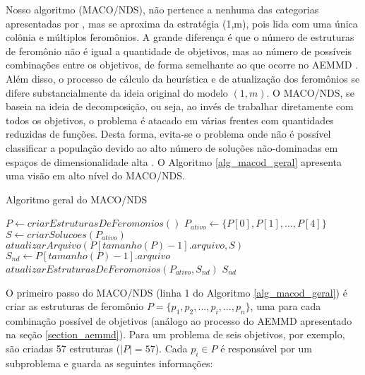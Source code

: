 Nosso algoritmo (MACO/NDS), não pertence a nenhuma das categorias apresentadas por \cite{Alaya2007}, mas se aproxima da estratégia (1,m), pois lida com uma única colônia e múltiplos feromônios. A grande diferença é que o número de estruturas de feromônio não é igual a quantidade de objetivos, mas ao número de possíveis combinações entre os objetivos, de forma semelhante ao que ocorre no AEMMD \cite{Lafeta2017}. Além disso, o processo de cálculo da heurística e de atualização dos feromônios se difere substancialmente da ideia original do modelo $(1,m)$. O MACO/NDS, se baseia na ideia de decomposição, ou seja, ao invés de trabalhar diretamente com todos os objetivos, o problema é atacado em várias frentes com quantidades reduzidas de funções. Desta forma, evita-se o problema onde não é possível classificar a população devido ao alto número de soluções não-dominadas em espaços de dimensionalidade alta \cite{Deb2014}. O Algoritmo \ref{alg_macod_geral} apresenta uma visão em alto nível do MACO/NDS.

\begin{algorithm}[!htbp]
	\caption{Algoritmo geral do MACO/NDS}
	\label{alg_macod_geral}
	\begin{algorithmic}[1]
		\State $P \gets criarEstruturasDeFeromonios()$
		\State $P_{ativo} \gets \{P[0], P[1], ..., P[4]\}$
		\State $S \gets criarSolucoes(P_{ativo})$
		\State $atualizarArquivo(P[tamanho(P) - 1].arquivo, S)$
		\State $S_{nd} \gets P[tamanho(P) - 1].arquivo$
		\State $atualizarEstruturasDeFeromonios(P_{ativo}, S_{nd})$
		\EndWhile
		\State \Return $S_{nd}$
	\end{algorithmic}
\end{algorithm}

O primeiro passo do MACO/NDS (linha 1 do Algoritmo \ref{alg_macod_geral}) é criar as estruturas de feromônio $P = \{p_1, p_2, ..., p_i, ..., p_n\}$, uma para cada combinação possível de objetivos (análogo ao processo do AEMMD apresentado na seção \ref{section_aemmd}). Para um problema de seis objetivos, por exemplo, são criadas 57 estruturas ($|P| = 57$). Cada $p_i \in P$ é responsável por um subproblema e guarda as seguintes informações:

